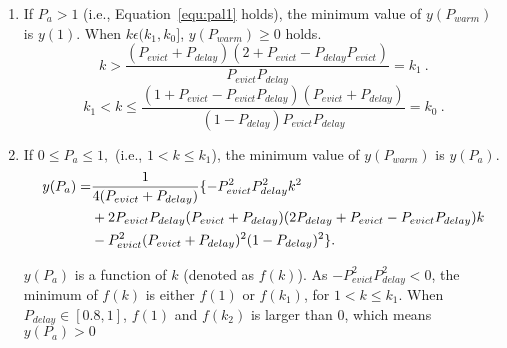 \begin{enumerate}


  \item If $P_{a} > 1$ (i.e., Equation~\ref{equ:pal1} holds), the minimum value of $y(P_{warm})$ is $y(1)$.
  When $k \epsilon (k_{1}, k_{0}]$, $y(P_{warm}) \geq 0$ holds.
    \begin{equation}
    \label{equ:pal1}
    k > \frac{(P_{evict}+P_{delay})(2+P_{evict}-P_{delay}P_{evict})}{P_{evict}P_{delay}} = k_{1} \ .
  \end{equation}
  \begin{equation}
   k_{1} < k \leq \frac{(1 + P_{evict}- P_{evict}P_{delay})(P_{evict}+P_{delay})}{(1 - P_{delay})P_{evict}P_{delay}} = k_{0}\ .
  \end{equation}


  \item If $0 \leq P_{a} \leq 1,$ (i.e., $1 < k \leq k_{1}$), the minimum value of $y(P_{warm})$ is $y(P_{a})$.
  \begin{equation}\begin{split}
    \scriptsize
    y(P_{a}) =& \frac{1}{4(P_{evict}+P_{delay})}\{-P_{evict}^{2}P_{delay}^{2}k^{2}\\ &+ 2P_{evict}P_{delay}(P_{evict}+P_{delay})(2P_{delay}+P_{evict}-P_{evict}P_{delay})k\\ & - P_{evict}^{2}(P_{evict}+P_{delay})^{2}(1-P_{delay})^{2}\}.
  \end{split}\end{equation}

 $y(P_{a})$ is a function of $k$ (denoted as $f(k)$). As $-P_{evict}^{2}P_{delay}^{2} < 0$, the minimum of $f(k)$ is either $f(1)$ or $f(k_{1})$, for $1 < k \leq k_{1}$. When $P_{delay} \in [0.8,1]$, $f(1)$ and  $f(k_{2})$ is larger than $0$, which means $y(P_{a}) > 0$


\end{enumerate}
